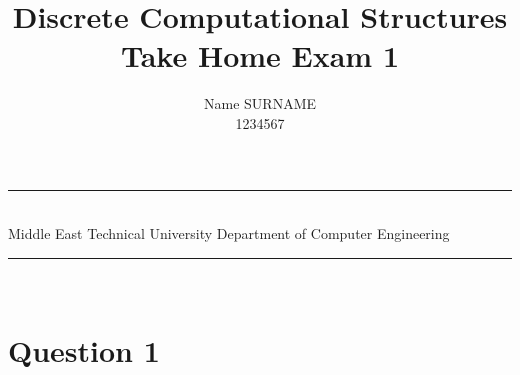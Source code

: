 \documentclass[a4paper,12pt]{article}
\title{Discrete Computational Structures \\ Take Home Exam 1}
\author{Name SURNAME \\ 1234567} %
\date{} %
\newcommand{\HRule}{\rule{\linewidth}{1mm}}
\begin{document}
\HRule\\
Middle East Technical University \hfill Department of Computer Engineering
{\let\newpage\relax\maketitle}
\HRule\\
\vspace{1cm}


\section*{Question 1 \hfill {}}
\end{document}
